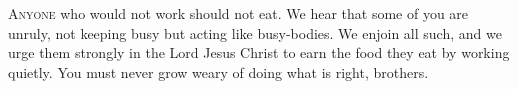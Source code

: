 
\lettrine{A}{nyone} who would not work should not eat. We hear that some of you are unruly, not keeping busy but acting like busy-bodies. We enjoin all such, and we urge them strongly in the Lord Jesus Christ to earn the food they eat by working quietly. You must never grow weary of doing what is right, brothers.